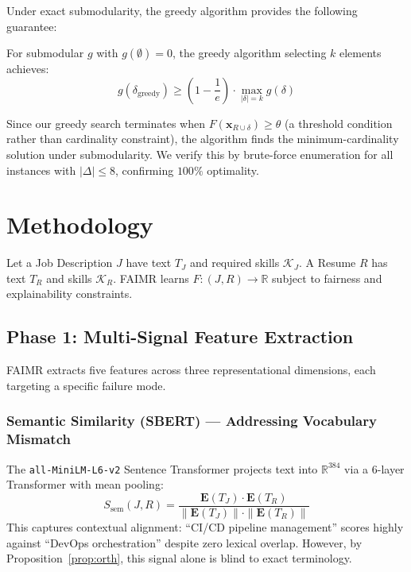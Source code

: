 \documentclass{svproc}
\begin{document}
Under exact submodularity, the greedy algorithm provides the following guarantee:

\begin{theorem}
For submodular $g$ with $g(\emptyset) = 0$, the greedy algorithm selecting $k$ elements achieves:
\begin{equation}
    g(\delta_\text{greedy}) \geq \left(1 - \frac{1}{e}\right) \cdot \max_{|\delta| = k} g(\delta)
\end{equation}
\end{theorem}

Since our greedy search terminates when $F(\mathbf{x}_{R \cup \delta}) \geq \theta$ (a threshold condition rather than cardinality constraint), the algorithm finds the minimum-cardinality solution under submodularity. We verify this by brute-force enumeration for all instances with $|\Delta| \leq 8$, confirming $100\%$ optimality.

\section{Methodology}\label{sec:method}

Let a Job Description $J$ have text $T_J$ and required skills $\mathcal{K}_J$. A Resume $R$ has text $T_R$ and skills $\mathcal{K}_R$. FAIMR learns $F: (J, R) \to \mathbb{R}$ subject to fairness and explainability constraints.

\subsection{Phase 1: Multi-Signal Feature Extraction}

FAIMR extracts five features across three representational dimensions, each targeting a specific failure mode.

\subsubsection{Semantic Similarity (SBERT) --- Addressing Vocabulary Mismatch}
The \texttt{all-MiniLM-L6-v2} Sentence Transformer projects text into $\mathbb{R}^{384}$ via a 6-layer Transformer with mean pooling:
\begin{equation}
    S_{\mathrm{sem}}(J, R) = \frac{\mathbf{E}(T_J) \cdot \mathbf{E}(T_R)}{\|\mathbf{E}(T_J)\| \cdot \|\mathbf{E}(T_R)\|}
\end{equation}
This captures contextual alignment: ``CI/CD pipeline management'' scores highly against ``DevOps orchestration'' despite zero lexical overlap. However, by Proposition~\ref{prop:orth}, this signal alone is blind to exact terminology.
\end{document}
